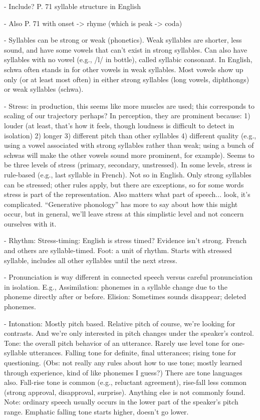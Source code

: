- Include? P. 71 syllable structure in English

- Also P. 71 with onset -> rhyme (which is peak -> coda)

- Syllables can be strong or weak (phonetics).
  Weak syllables are shorter, less sound, and have some vowels
  that can't exist in strong syllables. Can also have syllables
  with no vowel (e.g., /l/ in bottle), called syllabic consonant.
  In English, schwa often stands in for other vowels in weak syllables.
  Most vowels show up only (or at least most often) in either strong
  syllables (long vowels, diphthongs) or weak syllables (schwa).

- Stress: in production, this seems like more muscles are used;
  this corresponds to scaling of our trajectory perhaps?
  In perception, they are prominent because:
  1) louder (at least, that's how it feels, though loudness is
  difficult to detect in isolation)
  2) longer
  3) different pitch than other syllables
  4) different quality (e.g., using a vowel associated with strong
     syllables rather than weak; using a bunch of schwas will make
     the other vowels sound more prominent, for example).
  Seems to be three levels of stress (primary, secondary, unstressed).
  In some levels, stress is rule-based (e.g., last syllable in French).
  Not so in English. Only strong syllables can be stressed;
  other rules apply, but there are exceptions, so for some words
  stress is part of the representation. Also matters what part of speech...
  look, it's complicated. ``Generative phonology'' has more to say
  about how this might occur, but in general, we'll leave stress
  at this simplistic level and not concern ourselves with it.

- Rhythm: Stress-timing: English is stress timed?
  Evidence isn't strong.
  French and others are syllable-timed.
  Foot: a unit of rhythm. Starts with stressed syllable, includes
  all other syllables until the next stress.

- Pronunciation is way different in connected speech versus
  careful pronunciation in isolation. E.g.,
  Assimilation: phonemes in a syllable change due to the phoneme
  directly after or before.
  Elision: Sometimes sounds disappear; deleted phonemes.

- Intonation: Mostly pitch based. Relative pitch of course, we're
  looking for contrasts. And we're only interested in pitch
  changes under the speaker's control.
  Tone: the overall pitch behavior of an utterance.
  Rarely use level tone for one-syllable utterances.
  Falling tone for definite, final utterances;
  rising tone for questioning.
  (Obs: not really any rules about how to use tone;
  mostly learned through experience, kind of like phonemes
  I guess?) There are tone languages also.
  Fall-rise tone is common (e.g., reluctant agreement),
  rise-fall less common (strong approval, disapproval, surprise).
  Anything else is not commonly found.
  Note: ordinary speech usually occurs in the lower part
  of the speaker's pitch range. Emphatic falling tone
  starts higher, doesn't go lower.


